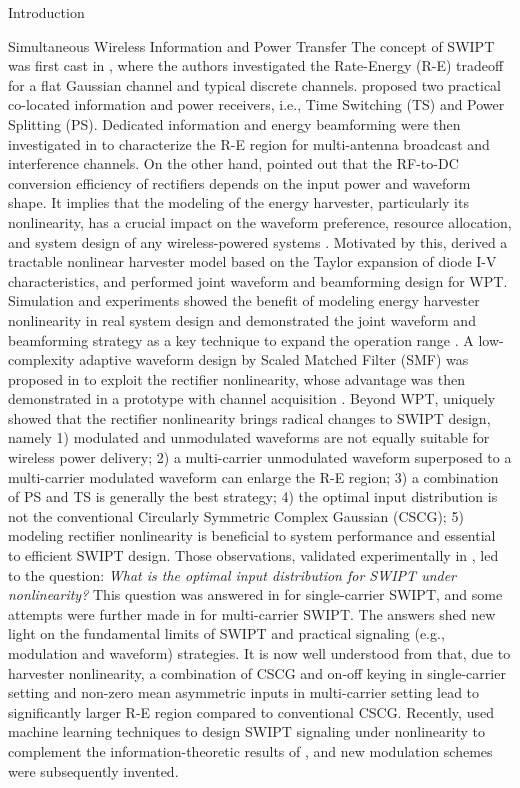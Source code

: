 \documentclass[journal,12pt,onecolumn,draftclsnofoot]{IEEEtran}
\begin{document}
\begin{section}{Introduction}
\begin{subsection}{Simultaneous Wireless Information and Power Transfer}
            The concept of SWIPT was first cast in \cite{Varshney2008}, where the authors investigated the Rate-Energy (R-E) tradeoff for a flat Gaussian channel and typical discrete channels. \cite{Zhou2013} proposed two practical co-located information and power receivers, i.e., Time Switching (TS) and Power Splitting (PS). Dedicated information and energy beamforming were then investigated in \cite{Zhang2013,Park2014} to characterize the R-E region for multi-antenna broadcast and interference channels. On the other hand, \cite{Trotter2009} pointed out that the RF-to-DC conversion efficiency of rectifiers depends on the input power and waveform shape. It implies that the modeling of the energy harvester, particularly its nonlinearity, has a crucial impact on the waveform preference, resource allocation, and system design of any wireless-powered systems \cite{Trotter2009,Clerckx2018,Clerckx2019}. Motivated by this, \cite{Clerckx2016a} derived a tractable nonlinear harvester model based on the Taylor expansion of diode I-V characteristics, and performed joint waveform and beamforming design for WPT. Simulation and experiments showed the benefit of modeling energy harvester nonlinearity in real system design \cite{Kim2019,Kim2020a} and demonstrated the joint waveform and beamforming strategy as a key technique to expand the operation range \cite{Kim2021}. A low-complexity adaptive waveform design by Scaled Matched Filter (SMF) was proposed in \cite{Clerckx2017} to exploit the rectifier nonlinearity, whose advantage was then demonstrated in a prototype with channel acquisition \cite{Kim2017}. Beyond WPT, \cite{Clerckx2018b} uniquely showed that the rectifier nonlinearity brings radical changes to SWIPT design, namely 1) modulated and unmodulated waveforms are not equally suitable for wireless power delivery; 2) a multi-carrier unmodulated waveform superposed to a multi-carrier modulated waveform can enlarge the R-E region; 3) a combination of PS and TS is generally the best strategy; 4) the optimal input distribution is not the conventional Circularly Symmetric Complex Gaussian (CSCG); 5) modeling rectifier nonlinearity is beneficial to system performance and essential to efficient SWIPT design. Those observations, validated experimentally in \cite{Kim2019}, led to the question: \emph{What is the optimal input distribution for SWIPT under nonlinearity?} This question was answered in \cite{Varasteh2020} for single-carrier SWIPT, and some attempts were further made in \cite{Varasteh2019d} for multi-carrier SWIPT. The answers shed new light on the fundamental limits of SWIPT and practical signaling (e.g., modulation and waveform) strategies. It is now well understood from \cite{Clerckx2018b,Varasteh2020,Varasteh2019d} that, due to harvester nonlinearity, a combination of CSCG and on-off keying in single-carrier setting and non-zero mean asymmetric inputs in multi-carrier setting lead to significantly larger R-E region compared to conventional CSCG. Recently, \cite{Varasteh2020a} used machine learning techniques to design SWIPT signaling under nonlinearity to complement the information-theoretic results of \cite{Varasteh2020}, and new modulation schemes were subsequently invented.

\end{subsection}
\end{section}
\end{document}
